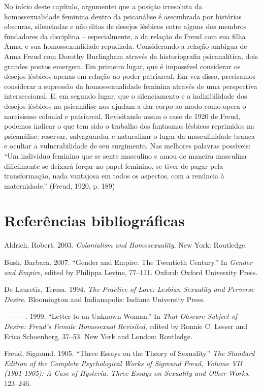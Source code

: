 No início deste capítulo, argumentei que a posição irresoluta da
homossexualidade feminina dentro da psicanálise é assombrada por
histórias obscuras, silenciadas e não ditas de desejos lésbicos entre
alguns dos membros fundadores da disciplina -- especialmente, a da
relação de Freud com sua filha Anna, e sua homossexualidade repudiada.
Considerando a relação ambígua de Anna Freud com Dorothy Burlingham
através da historiografia psicanalítica, dois grandes pontos emergem. Em
primeiro lugar, que é impossível considerar os desejos lésbicos apenas
em relação ao poder patriarcal. Em vez disso, precisamos considerar a
supressão da homossexualidade feminina através de uma perspectiva
interseccional. E, em segundo lugar, que o silenciamento e a
indizibilidade dos desejos lésbicos na psicanálise nos ajudam a dar
corpo ao modo como opera o narcisismo colonial e patriarcal. Revisitando
assim o caso de 1920 de Freud, podemos indicar o que tem sido o trabalho
dos fantasmas lésbicos reprimidos na psicanálise: reservar, salvaguardar
e naturalizar o lugar da masculinidade branca e ocultar a
vulnerabilidade de seu surgimento. Nas melhores palavras possíveis: ``Um
indivíduo feminino que se sente masculino e amou de maneira masculina
dificilmente se deixará forçar no papel feminino, se tiver de pagar pela
transformação, nada vantajosa em todos os aspectos, com a renúncia à
maternidade.'' (Freud, 1920, p. 189)

\section{Referências bibliográficas}

Aldrich, Robert. 2003. \emph{Colonialism and Homosexuality}. New York:
Routledge.

Bush, Barbara. 2007. ``Gender and Empire: The Twentieth Century.'' In
\emph{Gender and Empire}, edited by Philippa Levine, 77--111. Oxford:
Oxford University Press.

De Lauretis, Teresa. 1994. \emph{The Practice of Love: Lesbian Sexuality
and Perverse Desire}. Bloomington and Indianapolis: Indiana University
Press.

---------. 1999. ``Letter to an Unknown Woman.'' In \emph{That Obscure
Subject of Desire: Freud's Female Homosexual Revisited}, edited by
Ronnie C. Lesser and Erica Schoenberg, 37--53. New York and London:
Routledge.

Freud, Sigmund. 1905. ``Three Essays on the Theory of Sexuality.''
\emph{The Standard Edition of the Complete Psychological Works of
Sigmund Freud, Volume VII (1901-1905): A Case of Hysteria, Three Essays
on Sexuality and Other Works}, 123--246.

